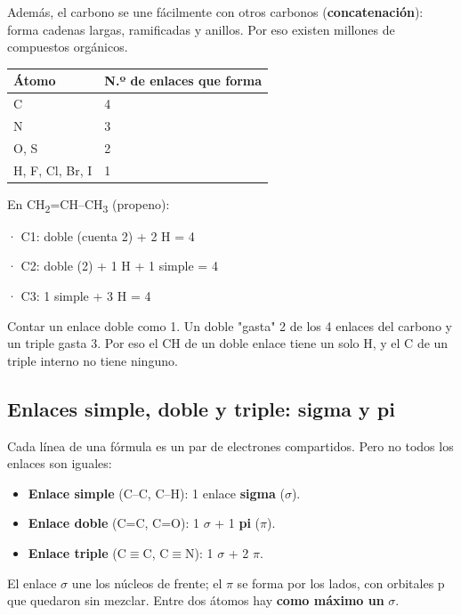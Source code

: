 Además, el carbono se une fácilmente con otros carbonos (\textbf{concatenación}): forma cadenas largas, ramificadas y anillos. Por eso existen millones de compuestos orgánicos.

 
\begin{center}\small
\begin{tabular}{@{}ll@{}}
\toprule
\textbf{Átomo} & \textbf{N.º de enlaces que forma} \\
\midrule
C & 4 \\
N & 3 \\
O, S & 2 \\
H, F, Cl, Br, I & 1 \\
\bottomrule
\end{tabular}
\end{center}
  
\begin{ejemplo} En CH\textsubscript{2}=CH--CH\textsubscript{3} (propeno):\par · C1: doble (cuenta 2) + 2 H = 4 \par · C2: doble (2) + 1 H + 1 simple = 4 \par · C3: 1 simple + 3 H = 4 \end{ejemplo}
 
\begin{ojo} Contar un enlace doble como 1. Un doble "gasta" 2 de los 4 enlaces del carbono y un triple gasta 3. Por eso el CH de un doble enlace tiene un solo H, y el C de un triple interno no tiene ninguno.\end{ojo}
\subsection{Enlaces simple, doble y triple: sigma y pi}
Cada línea de una fórmula es un par de electrones compartidos. Pero no todos los enlaces son iguales:

 
\begin{itemize}
  \item \textbf{Enlace simple} (C--C, C--H): 1 enlace \textbf{sigma} ($\sigma$).
  \item \textbf{Enlace doble} (C=C, C=O): 1 $\sigma$ + 1 \textbf{pi} ($\pi$).
  \item \textbf{Enlace triple} (C\ensuremath{\equiv}C, C\ensuremath{\equiv}N): 1 $\sigma$ + 2 $\pi$.
\end{itemize}
 

El enlace $\sigma$ une los núcleos de frente; el $\pi$ se forma por los lados, con orbitales p que quedaron sin mezclar. Entre dos átomos hay \textbf{como máximo un} $\sigma$.

